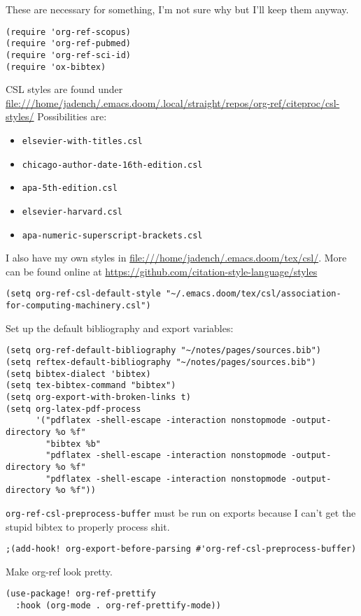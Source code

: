 \documentclass[11pt]{article}
\begin{document}
These are necessary for something, I'm not sure why but I'll keep them anyway.
\begin{verbatim}
(require 'org-ref-scopus)
(require 'org-ref-pubmed)
(require 'org-ref-sci-id)
(require 'ox-bibtex)
\end{verbatim}

CSL styles are found under \url{file:///home/jadench/.emacs.doom/.local/straight/repos/org-ref/citeproc/csl-styles/}
Possibilities are: 
\begin{itemize}
\item \texttt{elsevier-with-titles.csl}
\item \texttt{chicago-author-date-16th-edition.csl}
\item \texttt{apa-5th-edition.csl}
\item \texttt{elsevier-harvard.csl}
\item \texttt{apa-numeric-superscript-brackets.csl}
\end{itemize}

I also have my own styles in \url{file:///home/jadench/.emacs.doom/tex/csl/}. More can be found online at \url{https://github.com/citation-style-language/styles}
\begin{verbatim}
(setq org-ref-csl-default-style "~/.emacs.doom/tex/csl/association-for-computing-machinery.csl")
\end{verbatim}

Set up the default bibliography and export variables:
\begin{verbatim}
(setq org-ref-default-bibliography "~/notes/pages/sources.bib")
(setq reftex-default-bibliography "~/notes/pages/sources.bib")
(setq bibtex-dialect 'bibtex)
(setq tex-bibtex-command "bibtex")
(setq org-export-with-broken-links t)
(setq org-latex-pdf-process
      '("pdflatex -shell-escape -interaction nonstopmode -output-directory %o %f"
        "bibtex %b"
        "pdflatex -shell-escape -interaction nonstopmode -output-directory %o %f"
        "pdflatex -shell-escape -interaction nonstopmode -output-directory %o %f"))
\end{verbatim}

\texttt{org-ref-csl-preprocess-buffer} must be run on exports because I can't get the stupid bibtex to properly process shit.
\begin{verbatim}
;(add-hook! org-export-before-parsing #'org-ref-csl-preprocess-buffer)
\end{verbatim}

Make org-ref look pretty.
\begin{verbatim}
(use-package! org-ref-prettify
  :hook (org-mode . org-ref-prettify-mode))
\end{verbatim}
\end{document}
